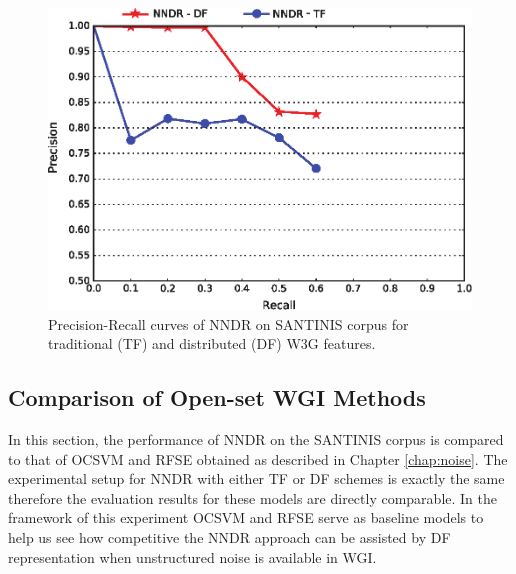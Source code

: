 \begin{figure}[t]

\begin{center}
\includegraphics[scale=0.99]{Figures/NNDR_W3G.eps}
\caption{Precision-Recall curves of NNDR on SANTINIS corpus for traditional (TF) and distributed (DF) W3G features.}
\label{chap:word_embeddings:fig:NNDR_W3G}
\end{center}

\end{figure}

\subsection{Comparison of Open-set WGI Methods}\label{chap:word_embeddings:sec:experiments_setup}

In this section, the performance of NNDR on the SANTINIS corpus is compared to that of OCSVM and RFSE obtained as described in Chapter \ref{chap:noise}. The experimental setup for NNDR with either TF or DF schemes is exactly the same therefore the evaluation results for these models are directly comparable. In the framework of this experiment OCSVM and RFSE serve as baseline models to help us see how competitive the NNDR approach can be assisted by DF representation when unstructured noise is available in WGI.

